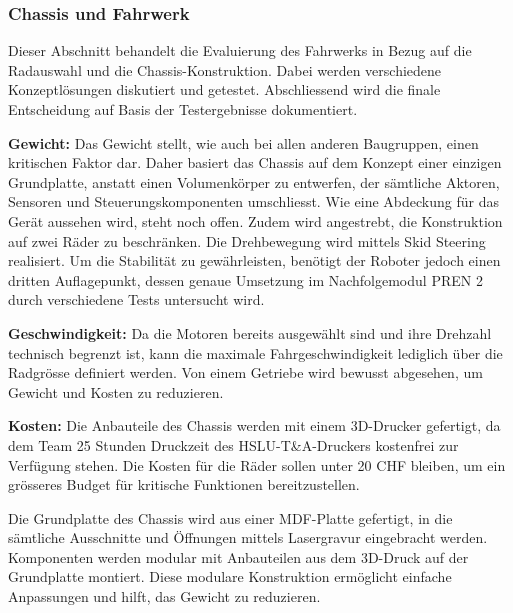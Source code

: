 \documentclass[main.tex]{subfiles} %
\begin{document}

\subsubsection{Chassis und Fahrwerk}

Dieser Abschnitt behandelt die Evaluierung des Fahrwerks in Bezug auf die
Radauswahl und die Chassis-Konstruktion. Dabei werden verschiedene
Konzeptlösungen diskutiert und getestet. Abschliessend wird die finale
Entscheidung auf Basis der Testergebnisse dokumentiert.


\textbf{Gewicht:} \newline
Das Gewicht stellt, wie auch bei allen anderen Baugruppen, einen kritischen Faktor dar.
Daher basiert das Chassis auf dem Konzept einer einzigen Grundplatte, anstatt einen
Volumenkörper zu entwerfen, der sämtliche Aktoren, Sensoren und Steuerungskomponenten
umschliesst. Wie eine Abdeckung für das Gerät aussehen wird, steht noch offen. 
Zudem wird angestrebt, die Konstruktion auf zwei Räder zu beschränken.
Die Drehbewegung wird mittels Skid Steering realisiert. Um die Stabilität zu
gewährleisten, benötigt der Roboter jedoch einen dritten Auflagepunkt, dessen genaue
Umsetzung im Nachfolgemodul PREN 2 durch verschiedene Tests untersucht wird.

\textbf{Geschwindigkeit:} \newline
Da die Motoren bereits ausgewählt sind und ihre Drehzahl technisch begrenzt ist,
kann die maximale Fahrgeschwindigkeit lediglich über die Radgrösse definiert werden.
Von einem Getriebe wird bewusst abgesehen, um Gewicht und Kosten zu reduzieren.

\textbf{Kosten:} \newline
Die Anbauteile des Chassis werden mit einem 3D-Drucker gefertigt, da dem Team
25 Stunden Druckzeit des HSLU-T\&A-Druckers kostenfrei zur Verfügung stehen.
Die Kosten für die Räder sollen unter 20 CHF bleiben, um ein grösseres Budget
für kritische Funktionen bereitzustellen.


Die Grundplatte des Chassis wird aus einer MDF-Platte gefertigt, in die
sämtliche Ausschnitte und Öffnungen mittels Lasergravur eingebracht werden.
Komponenten werden modular mit Anbauteilen aus dem 3D-Druck auf der Grundplatte
montiert. Diese modulare Konstruktion ermöglicht einfache Anpassungen und
hilft, das Gewicht zu reduzieren.
\end{document}
